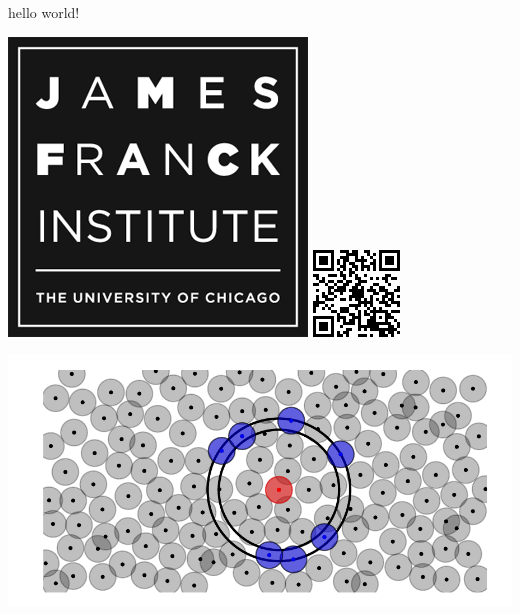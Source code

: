 \documentclass{article}
\begin{document}
hello world! 

\includegraphics[width=.1\linewidth]{figures/jfi_logo}
\includegraphics[width=.1\linewidth]{figures/tracking}

\includegraphics{figures/cartoon}
\end{document}
